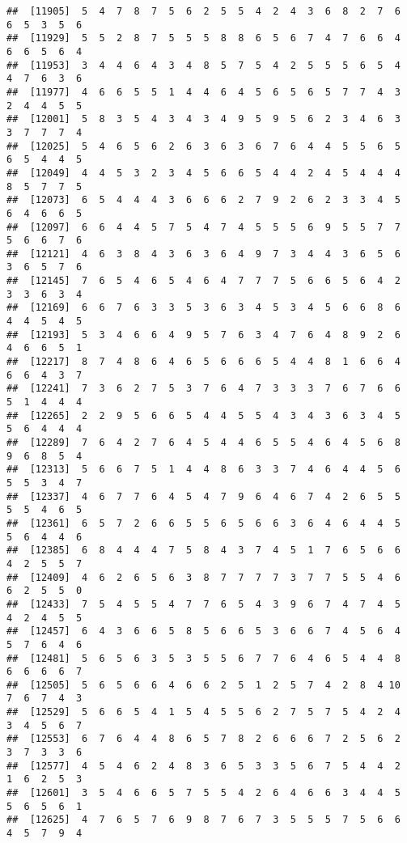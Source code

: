 \documentclass[
]{book}
\begin{document}
\begin{verbatim}
##  [11905]  5  4  7  8  7  5  6  2  5  5  4  2  4  3  6  8  2  7  6  6  5  3  5  6
##  [11929]  5  5  2  8  7  5  5  5  8  8  6  5  6  7  4  7  6  6  4  6  6  5  6  4
##  [11953]  3  4  4  6  4  3  4  8  5  7  5  4  2  5  5  5  6  5  4  4  7  6  3  6
##  [11977]  4  6  6  5  5  1  4  4  6  4  5  6  5  6  5  7  7  4  3  2  4  4  5  5
##  [12001]  5  8  3  5  4  3  4  3  4  9  5  9  5  6  2  3  4  6  3  3  7  7  7  4
##  [12025]  5  4  6  5  6  2  6  3  6  3  6  7  6  4  4  5  5  6  5  6  5  4  4  5
##  [12049]  4  4  5  3  2  3  4  5  6  6  5  4  4  2  4  5  4  4  4  8  5  7  7  5
##  [12073]  6  5  4  4  4  3  6  6  6  2  7  9  2  6  2  3  3  4  5  6  4  6  6  5
##  [12097]  6  6  4  4  5  7  5  4  7  4  5  5  5  6  9  5  5  7  7  5  6  6  7  6
##  [12121]  4  6  3  8  4  3  6  3  6  4  9  7  3  4  4  3  6  5  6  3  6  5  7  6
##  [12145]  7  6  5  4  6  5  4  6  4  7  7  7  5  6  6  5  6  4  2  3  3  6  3  4
##  [12169]  6  6  7  6  3  3  5  3  6  3  4  5  3  4  5  6  6  8  6  4  4  5  4  5
##  [12193]  5  3  4  6  6  4  9  5  7  6  3  4  7  6  4  8  9  2  6  4  6  6  5  1
##  [12217]  8  7  4  8  6  4  6  5  6  6  6  5  4  4  8  1  6  6  4  6  6  4  3  7
##  [12241]  7  3  6  2  7  5  3  7  6  4  7  3  3  3  7  6  7  6  6  5  1  4  4  4
##  [12265]  2  2  9  5  6  6  5  4  4  5  5  4  3  4  3  6  3  4  5  5  6  4  4  4
##  [12289]  7  6  4  2  7  6  4  5  4  4  6  5  5  4  6  4  5  6  8  9  6  8  5  4
##  [12313]  5  6  6  7  5  1  4  4  8  6  3  3  7  4  6  4  4  5  6  5  5  3  4  7
##  [12337]  4  6  7  7  6  4  5  4  7  9  6  4  6  7  4  2  6  5  5  5  5  4  6  5
##  [12361]  6  5  7  2  6  6  5  5  6  5  6  6  3  6  4  6  4  4  5  5  6  4  4  6
##  [12385]  6  8  4  4  4  7  5  8  4  3  7  4  5  1  7  6  5  6  6  4  2  5  5  7
##  [12409]  4  6  2  6  5  6  3  8  7  7  7  7  3  7  7  5  5  4  6  6  2  5  5  0
##  [12433]  7  5  4  5  5  4  7  7  6  5  4  3  9  6  7  4  7  4  5  4  2  4  5  5
##  [12457]  6  4  3  6  6  5  8  5  6  6  5  3  6  6  7  4  5  6  4  5  7  6  4  6
##  [12481]  5  6  5  6  3  5  3  5  5  6  7  7  6  4  6  5  4  4  8  6  6  6  6  7
##  [12505]  5  6  5  6  6  4  6  6  2  5  1  2  5  7  4  2  8  4 10  7  6  7  4  3
##  [12529]  5  6  6  5  4  1  5  4  5  5  6  2  7  5  7  5  4  2  4  3  4  5  6  7
##  [12553]  6  7  6  4  4  8  6  5  7  8  2  6  6  6  7  2  5  6  2  3  7  3  3  6
##  [12577]  4  5  4  6  2  4  8  3  6  5  3  3  5  6  7  5  4  4  2  1  6  2  5  3
##  [12601]  3  5  4  6  6  5  7  5  5  4  2  6  4  6  6  3  4  4  5  5  6  5  6  1
##  [12625]  4  7  6  5  7  6  9  8  7  6  7  3  5  5  5  7  5  6  6  4  5  7  9  4

\end{verbatim}
\end{document}
